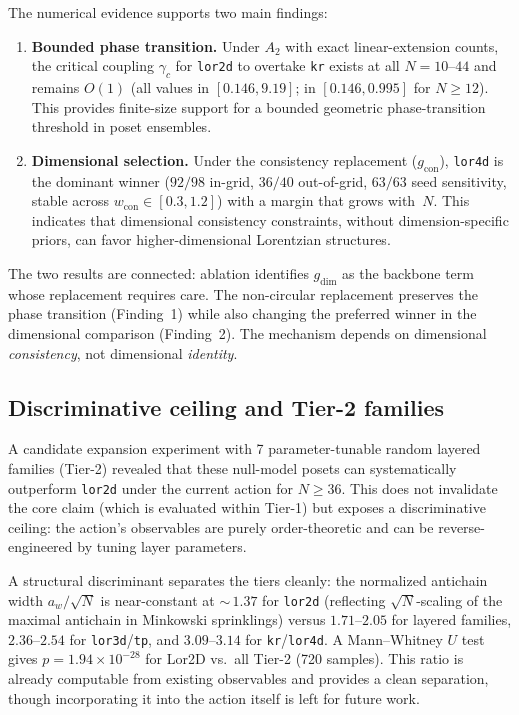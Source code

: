 \documentclass[12pt,a4paper]{article}
\begin{document}
The numerical evidence supports two main findings:

\begin{enumerate}[nosep]
\item \textbf{Bounded phase transition.} Under $A_2$ with exact linear-extension counts, the
critical coupling $\gamma_c$ for \texttt{lor2d} to overtake \texttt{kr} exists
at all $N = 10$--$44$ and remains $O(1)$ (all values in $[0.146, 9.19]$; in
$[0.146, 0.995]$ for $N \geq 12$). This provides finite-size support for a
bounded geometric phase-transition threshold in poset ensembles.

\item \textbf{Dimensional selection.} Under the consistency replacement
($g_{\text{con}}$), \texttt{lor4d} is the dominant winner ($92/98$ in-grid,
$36/40$ out-of-grid, $63/63$ seed sensitivity, stable across
$w_{\text{con}} \in [0.3, 1.2]$) with a margin that grows with~$N$.
This indicates that dimensional consistency constraints, without
dimension-specific priors, can favor higher-dimensional Lorentzian
structures.
\end{enumerate}

The two results are connected: ablation identifies $g_{\text{dim}}$ as the
backbone term whose replacement requires care. The non-circular replacement
preserves the phase transition (Finding~1) while also changing the preferred
winner in the dimensional comparison (Finding~2). The mechanism depends on
dimensional \emph{consistency}, not dimensional \emph{identity}.

\subsection{Discriminative ceiling and Tier-2 families}
\label{sec:ceiling}

A candidate expansion experiment with 7 parameter-tunable random layered
families (Tier-2) revealed that these null-model posets can systematically
outperform \texttt{lor2d} under the current action for $N \geq 36$. This does
not invalidate the core claim (which is evaluated within Tier-1) but exposes a
discriminative ceiling: the action's observables are purely order-theoretic and
can be reverse-engineered by tuning layer parameters.

A structural discriminant separates the tiers cleanly: the normalized antichain
width $a_w / \sqrt{N}$ is near-constant at ${\sim}\,1.37$ for \texttt{lor2d}
(reflecting $\sqrt{N}$-scaling of the maximal antichain in Minkowski
sprinklings) versus $1.71\text{--}2.05$ for layered families,
$2.36\text{--}2.54$ for \texttt{lor3d}/\texttt{tp}, and
$3.09\text{--}3.14$ for \texttt{kr}/\texttt{lor4d}.
A Mann--Whitney $U$ test gives $p = 1.94 \times 10^{-28}$ for Lor2D vs.\ all
Tier-2 (720 samples). This ratio is already computable from existing observables
and provides a clean separation, though incorporating it into the action itself
is left for future work.
\end{document}
